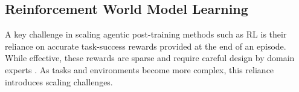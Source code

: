 \documentclass{article}
\theoremstyle{plain}
\theoremstyle{definition}
\theoremstyle{remark}
\newcommand{\method}[0]{Reinforcement World Model Learning}
\newcommand{\wmrl}[0]{\method}
\begin{document}
\subsection{\wmrl{}}
\label{subsec:WMRL}
A key challenge in scaling agentic post-training methods such as RL is their reliance on accurate task-success rewards provided at the end of an episode.
While effective, these rewards are sparse and require careful design by domain experts \citep{barres2025tau2benchevaluatingconversationalagents,xie2024osworldbenchmarkingmultimodalagents,rawles2025androidworlddynamicbenchmarkingenvironment,zhou2024webarenarealisticwebenvironment}.
As tasks and environments become more complex, this reliance introduces scaling challenges.
\end{document}

